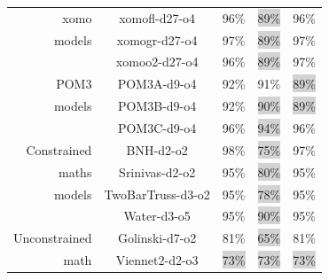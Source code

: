 \documentclass[10pt,journal,compsoc]{IEEEtran}
\newenvironment{changed}{\par}{\par}
\begin{document}
\begin{changed}
\begin{figure}[!t]
\begin{tabular}{|r|c|c|c|c|}
xomo 	&	xomofl-d27-o4	&	96\%	&	\colorbox{lightgray}{89\%}	&	96\%	\\
models	&	xomogr-d27-o4	&	97\%	&	\colorbox{lightgray}{89\%}	&	97\%	\\
	&	xomoo2-d27-o4	&	96\%	&	\colorbox{lightgray}{89\%}	&	97\%	\\
POM3 	&	POM3A-d9-o4	&	92\%	&	91\%	&	\colorbox{lightgray}{89\%}	\\
models	&	POM3B-d9-o4	&	92\%	&	\colorbox{lightgray}{90\%}	&	\colorbox{lightgray}{89\%}	\\
	&	POM3C-d9-o4	&	96\%	&	\colorbox{lightgray}{94\%}	&	96\%	\\ \hline
Constrained	&	BNH-d2-o2	&	98\%	&	\colorbox{lightgray}{75\%}	&	97\%	\\
maths&	Srinivas-d2-o2	&	95\%	&	\colorbox{lightgray}{80\%}	&	95\%	\\
models	&	TwoBarTruss-d3-o2	&	95\%	&	\colorbox{lightgray}{78\%}	&	95\%	\\
	&	Water-d3-o5	&	95\%	&	\colorbox{lightgray}{90\%}	&	95\%	\\ \hline
Unconstrained	&	Golinski-d7-o2	&	81\%	&	\colorbox{lightgray}{65\%}	&	81\%	\\
math	&	Viennet2-d2-o3	&	\colorbox{lightgray}{73\%}	&	\colorbox{lightgray}{73\%}	&	\colorbox{lightgray}{73\%}	\\

\end{tabular}
\end{figure}
\end{changed}
\end{document}
